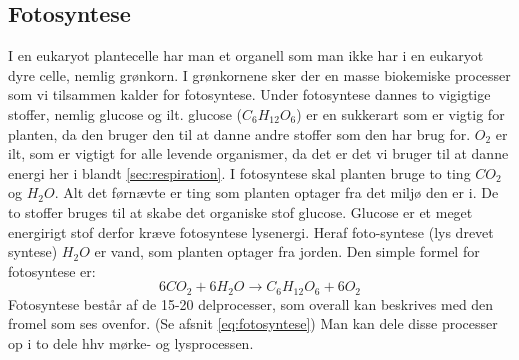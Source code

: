         \subsection{Fotosyntese}
            I en eukaryot plantecelle har man et organell som man ikke har i en eukaryot dyre celle, nemlig grønkorn. I grønkornene sker der en masse biokemiske processer som vi tilsammen kalder for fotosyntese. Under fotosyntese dannes to vigigtige stoffer, nemlig glucose og ilt. glucose (\begin{math}C_6H_{12}O_6\end{math}) er en sukkerart som er vigtig for planten, da den bruger den til at danne andre stoffer som den har brug for. 
            \begin{math}O_2\end{math} er ilt, som er vigtigt for alle levende organismer, da det er det vi bruger til at danne energi her i blandt \ref{sec:respiration}.
            I fotosyntese skal planten bruge to ting \begin{math}CO_2\end{math} og \begin{math}H_2O\end{math}. Alt det førnævte er ting som planten optager fra det miljø den er i. De to stoffer bruges til at skabe det organiske stof glucose. Glucose er et meget energirigt stof derfor kræve fotosyntese lysenergi. Heraf foto-syntese (lys drevet syntese)  \begin{math}H_2O\end{math} er vand, som planten optager fra jorden.
            Den simple formel for fotosyntese er: \begin{equation} 6CO_2 + 6H_2O \rightarrow C_6H_{12}O_6 + 6O_2 \end{equation}\label{eq:fotosyntese}
            Fotosyntese består af de 15-20 delprocesser, som overall kan beskrives med den fromel som ses ovenfor. (Se afsnit \ref{eq:fotosyntese})
            Man kan dele disse processer op i to dele hhv mørke- og lysprocessen. \newline 
